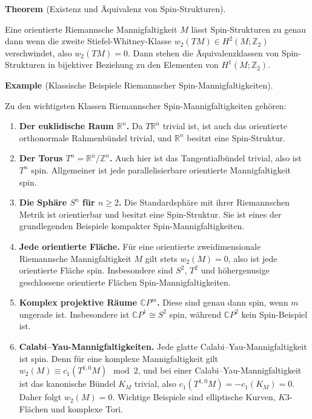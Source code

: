 \documentclass[10pt, letterpaper]{article}
\newcommand{\R}{\mathbb{R}}
\newcommand{\Z}{\mathbb{Z}}
\newcommand{\CP}{\mathbb{C} P}
\newcommand{\CustomHeading}[3]{%
  \par\medskip\noindent%
  \textbf{#1 #2} \textnormal{(#3)}.\enskip%
}
\newenvironment{THEO}[2]{\CustomHeading{Theorem}{#1}{#2}}{}
\newenvironment{EXA}[2]{\CustomHeading{Example}{#1}{#2}}{}
\begin{document}
\begin{THEO}{\parencite[p.~86]{LawsonMichelsohn2016}}{Existenz und Äquivalenz von Spin-Strukturen}
    Eine orientierte Riemannsche Mannigfaltigkeit $M$ lässt Spin-Strukturen zu genau dann wenn die zweite Stiefel-Whitney-Klasse $w_2(TM) \in H^2(M ; \mathbb{Z}_2)$ verschwindet, also $w_2(TM)=0$. Dann stehen die Äquivalenzklassen von Spin-Strukturen in bijektiver Beziehung zu den Elementen von $H^1\left(M; \mathbb{Z}_2\right)$.
\end{THEO}



\begin{EXA}{\parencite[p.~85-93]{LawsonMichelsohn2016}}{Klassische Beispiele Riemannscher Spin-Mannigfaltigkeiten} 
Zu den wichtigsten Klassen Riemannscher Spin-Mannigfaltigkeiten gehören:

\begin{enumerate}
    \item \textbf{Der euklidische Raum \(\R^n\).}  
    Da \(T\R^n\) trivial ist, ist auch das orientierte orthonormale Rahmenbündel trivial, und \(\R^n\) besitzt eine Spin-Struktur.

    \item \textbf{Der Torus \(T^n=\R^n/\Z^n\).}  
    Auch hier ist das Tangentialbündel trivial, also ist \(T^n\) spin. Allgemeiner ist jede parallelisierbare orientierte Mannigfaltigkeit spin.

    \item \textbf{Die Sphäre \(S^n\) für \(n\ge 2\).}  
    Die Standardsphäre mit ihrer Riemannschen Metrik ist orientierbar und besitzt eine Spin-Struktur. Sie ist eines der grundlegenden Beispiele kompakter Spin-Mannigfaltigkeiten.

    \item \textbf{Jede orientierte Fläche.}  
    Für eine orientierte zweidimensionale Riemannsche Mannigfaltigkeit \(M\) gilt stets $w_2(M)=0$, also ist jede orientierte Fläche spin. Insbesondere sind \(S^2\), \(T^2\) und höhergenusige geschlossene orientierte Flächen Spin-Mannigfaltigkeiten.

    \item \textbf{Komplex projektive Räume \(\CP^m\).}  
    Diese sind genau dann spin, wenn \(m\) ungerade ist. Insbesondere ist \(\CP^1\cong S^2\) spin, während \(\CP^2\) kein Spin-Beispiel ist.

    \item \textbf{Calabi--Yau-Mannigfaltigkeiten.}  
    Jede glatte Calabi--Yau-Mannigfaltigkeit ist spin. Denn für eine komplexe Mannigfaltigkeit gilt $w_2(M)\equiv c_1(T^{1,0}M)\mod 2$, und bei einer Calabi--Yau-Mannigfaltigkeit ist das kanonische Bündel \(K_M\) trivial, also $c_1(T^{1,0}M)=-c_1(K_M)=0$. Daher folgt $w_2(M)=0$. Wichtige Beispiele sind elliptische Kurven, \(K3\)-Flächen und komplexe Tori.
    

\end{enumerate}
\end{EXA}
\end{document}
